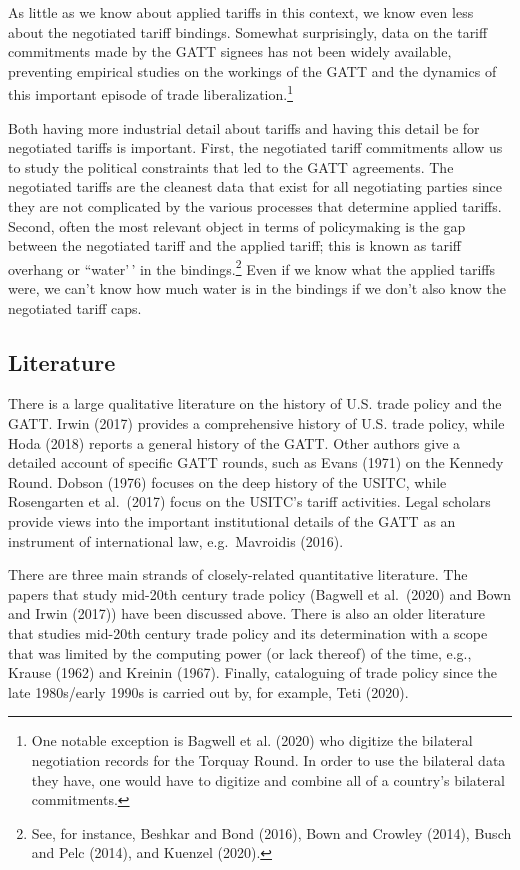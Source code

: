 \documentclass[
  12pt,
]{article}
\begin{document}
As little as we know about applied tariffs in this context, we know even less about the negotiated tariff bindings. Somewhat surprisingly, data on the tariff commitments made by the GATT signees has not been widely available, preventing empirical studies on the workings of the GATT and the dynamics of this important episode of trade liberalization.\footnote{One notable exception is Bagwell et al. (2020) who digitize the bilateral negotiation records for the Torquay Round. In order to use the bilateral data they have, one would have to digitize and combine all of a country's bilateral commitments.}

Both having more industrial detail about tariffs and having this detail be for negotiated tariffs is important. First, the negotiated tariff commitments allow us to study the political constraints that led to the GATT agreements. The negotiated tariffs are the cleanest data that exist for all negotiating parties since they are not complicated by the various processes that determine applied tariffs. Second, often the most relevant object in terms of policymaking is the gap between the negotiated tariff and the applied tariff; this is known as tariff overhang or ``water'\,' in the bindings.\footnote{See, for instance, Beshkar and Bond (2016), Bown and Crowley (2014), Busch and Pelc (2014), and Kuenzel (2020).} Even if we know what the applied tariffs were, we can't know how much water is in the bindings if we don't also know the negotiated tariff caps.

\hypertarget{literature}{%
\subsection{Literature}\label{literature}}

There is a large qualitative literature on the history of U.S. trade policy and the GATT. Irwin (2017) provides a comprehensive history of U.S. trade policy, while Hoda (2018) reports a general history of the GATT. Other authors give a detailed account of specific GATT rounds, such as Evans (1971) on the Kennedy Round. Dobson (1976) focuses on the deep history of the USITC, while Rosengarten et al.~(2017) focus on the USITC's tariff activities. Legal scholars provide views into the important institutional details of the GATT as an instrument of international law, e.g.~Mavroidis (2016).

There are three main strands of closely-related quantitative literature. The papers that study mid-20th century trade policy (Bagwell et al.~(2020) and Bown and Irwin (2017)) have been discussed above. There is also an older literature that studies mid-20th century trade policy and its determination with a scope that was limited by the computing power (or lack thereof) of the time, e.g., Krause (1962) and Kreinin (1967). Finally, cataloguing of trade policy since the late 1980s/early 1990s is carried out by, for example, Teti (2020).
\end{document}
